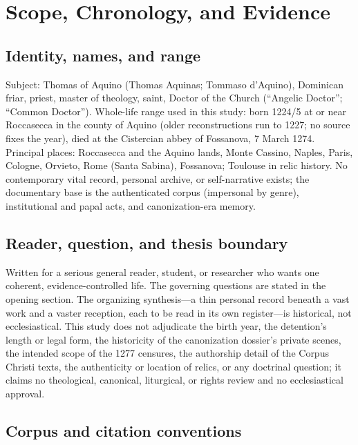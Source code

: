 \section{Scope, Chronology, and Evidence}

\subsection{Identity, names, and range}

Subject: Thomas of Aquino (Thomas Aquinas; Tommaso d'Aquino), Dominican
friar, priest, master of theology, saint, Doctor of the Church
(``Angelic Doctor''; ``Common Doctor''). Whole-life range used in this
study: born 1224/5 at or near Roccasecca in the county of Aquino (older
reconstructions run to 1227; no source fixes the year), died at the
Cistercian abbey of Fossanova, 7 March 1274. Principal places:
Roccasecca and the Aquino lands, Monte Cassino, Naples, Paris, Cologne,
Orvieto, Rome (Santa Sabina), Fossanova; Toulouse in relic history. No
contemporary vital record, personal archive, or self-narrative exists;
the documentary base is the authenticated corpus (impersonal by genre),
institutional and papal acts, and canonization-era memory.

\subsection{Reader, question, and thesis boundary}

Written for a serious general reader, student, or researcher who wants
one coherent, evidence-controlled life. The governing questions are
stated in the opening section. The organizing synthesis---a thin
personal record beneath a vast work and a vaster reception, each to be
read in its own register---is historical, not ecclesiastical. This
study does not adjudicate the birth year, the detention's length or
legal form, the historicity of the canonization dossier's private
scenes, the intended scope of the 1277 censures, the authorship detail
of the Corpus Christi texts, the authenticity or location of relics, or
any doctrinal question; it claims no theological, canonical, liturgical,
or rights review and no ecclesiastical approval.

\subsection{Corpus and citation conventions}

